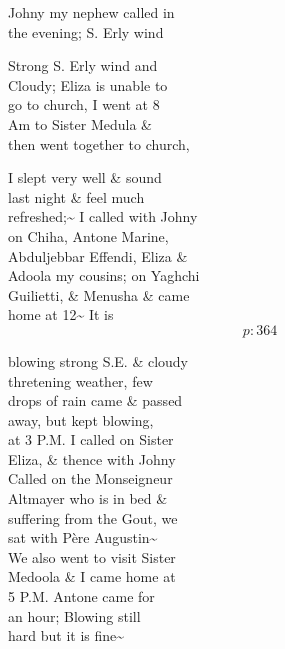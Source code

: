 \documentclass{report}
\begin{document}
	\par{
 	Johny my nephew called in\ \\the evening; S. Erly wind\ \\
	}

	\par{
 	Strong S. Erly wind and\ \\Cloudy; Eliza is unable to\ \\go to church, I went at 8\ \\Am to Sister Medula \&\ \\then went together to church,\ \\
	}

	\par{
 	I slept very well \& sound\ \\last night \& feel much\ \\refreshed;\~{} I called with Johny\ \\on Chiha, Antone Marine,\ \\Abduljebbar Effendi, Eliza \&\ \\Adoola my cousins; on Yaghchi\ \\Guilietti, \& Menusha \& came\ \\home at 12\~{} It is\ \\
  \[p: 364 \]

	}


	\par{
 	blowing strong S.E. \& cloudy\ \\thretening weather, few\ \\drops of rain came \& passed\ \\away, but kept blowing,\ \\at 3 P.M. I called on Sister\ \\Eliza, \& thence with Johny\ \\Called on the Monseigneur\ \\Altmayer who is in bed \&\ \\suffering from the Gout, we\ \\sat with Père Augustin\~{}\ \\We also went to visit Sister\ \\Medoola \& I came home at\ \\5 P.M. Antone came for\ \\an hour; Blowing still\ \\hard but it is fine\~{}\ \\
	}
\end{document}
